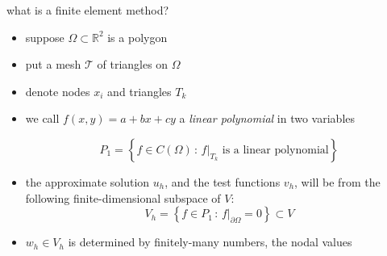 \documentclass[10pt,
               svgnames,
               hyperref={colorlinks,
                         citecolor=DeepPink4,
                         linkcolor=FireBrick,
                         urlcolor=blue},
               usepdftitle=false]{beamer}
\newcommand{\RR}{\mathbb{R}}
\begin{document}
\begin{frame}{what is a finite element method?}

\begin{itemize}
\item suppose $\Omega \subset \RR^2$ is a polygon
\item put a mesh $\mathcal{T}$ of triangles on $\Omega$
\item denote nodes $x_i$ and triangles $T_k$

\vspace{-20mm}

\hfill 

\medskip
\item we call $f(x,y)=a + bx + cy$ a \emph{linear polynomial} in two variables

\begin{definition}
    $$P_1 = \left\{f \in C(\Omega)\,:\,f\big|_{T_k} \text{ is a linear polynomial}\right\}$$
\end{definition}

\item the approximate solution $u_h$, and the test functions $v_h$, will be from the following \alert{finite-dimensional} subspace of $V$:
	$$V_h = \left\{f \in P_1\,:\,f\big|_{\partial\Omega} = 0\right\} \subset V$$
\item $w_h\in V_h$ is determined by finitely-many numbers, the nodal values
\end{itemize}
\end{frame}
\end{document}
